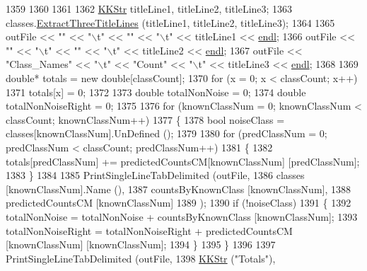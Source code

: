 \begin{DoxyCode}
{1359    
1360 
1361 
1362   \hyperlink{class_k_k_b_1_1_k_k_str}{KKStr}  titleLine1, titleLine2, titleLine3;
1363   classes.\hyperlink{class_k_k_m_l_l_1_1_m_l_class_list_ab333df46b706048637bb7b98ef552f59}{ExtractThreeTitleLines} (titleLine1, titleLine2, titleLine3);
1364 
1365   outFile << \textcolor{stringliteral}{""}            << \textcolor{stringliteral}{"\(\backslash\)t"} << \textcolor{stringliteral}{""}      << \textcolor{stringliteral}{"\(\backslash\)t"} << titleLine1 << \hyperlink{namespace_k_k_b_ad1f50f65af6adc8fa9e6f62d007818a8}{endl};
1366   outFile << \textcolor{stringliteral}{""}            << \textcolor{stringliteral}{"\(\backslash\)t"} << \textcolor{stringliteral}{""}      << \textcolor{stringliteral}{"\(\backslash\)t"} << titleLine2 << \hyperlink{namespace_k_k_b_ad1f50f65af6adc8fa9e6f62d007818a8}{endl};
1367   outFile << \textcolor{stringliteral}{"Class\_Names"} << \textcolor{stringliteral}{"\(\backslash\)t"} << \textcolor{stringliteral}{"Count"} << \textcolor{stringliteral}{"\(\backslash\)t"} << titleLine3 << \hyperlink{namespace_k_k_b_ad1f50f65af6adc8fa9e6f62d007818a8}{endl};
1368 
1369   \textcolor{keywordtype}{double}*  totals = \textcolor{keyword}{new} \textcolor{keywordtype}{double}[classCount];
1370   \textcolor{keywordflow}{for}  (x = 0; x < classCount; x++)
1371     totals[x] = 0;
1372 
1373   \textcolor{keywordtype}{double}  totalNonNoise = 0;
1374   \textcolor{keywordtype}{double}  totalNonNoiseRight = 0;
1375 
1376   \textcolor{keywordflow}{for}  (knownClassNum = 0;  knownClassNum < classCount;  knownClassNum++)
1377   \{
1378     \textcolor{keywordtype}{bool}  noiseClass = classes[knownClassNum].UnDefined ();
1379 
1380     \textcolor{keywordflow}{for}  (predClassNum = 0; predClassNum < classCount; predClassNum++)
1381     \{
1382       totals[predClassNum] += predictedCountsCM[knownClassNum] [predClassNum];
1383     \}
1384      
1385     PrintSingleLineTabDelimited (outFile, 
1386                                  classes            [knownClassNum].Name (),
1387                                  countsByKnownClass [knownClassNum],
1388                                  predictedCountsCM  [knownClassNum]
1389                                 );
1390     \textcolor{keywordflow}{if}  (!noiseClass)
1391     \{
1392       totalNonNoise      = totalNonNoise      + countsByKnownClass [knownClassNum];
1393       totalNonNoiseRight = totalNonNoiseRight + predictedCountsCM  [knownClassNum] [knownClassNum];
1394     \}
1395   \}
1396 
1397   PrintSingleLineTabDelimited (outFile, 
1398                                \hyperlink{class_k_k_b_1_1_k_k_str}{KKStr} (\textcolor{stringliteral}{"Totals"}),
}
\end{DoxyCode}
